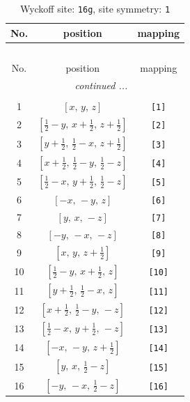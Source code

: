 \documentclass[fleqn,8pt]{jsarticle}
\begin{document}
\begin{longtable}{ccc}
\caption{Wyckoff site: {\tt 16g}, site symmetry: {\tt 1}}
 \\
 \hline \hline
No. & position & mapping \\ \hline \endfirsthead

\multicolumn{2}{l}{\tablename\ \thetable{}} \\
 \hline \hline
No. & position & mapping \\ \hline \endhead

 \hline \hline
\multicolumn{2}{r}{\footnotesize\it continued ...} \\ \endfoot

 \hline \hline
\multicolumn{2}{r}{} \\ \endlastfoot

1 & $\left[ x,\, y,\, z \right]$ & {\tt [1]} \\ \hline
2 & $\left[ \frac{1}{2} - y,\, x + \frac{1}{2},\, z + \frac{1}{2} \right]$ & {\tt [2]} \\ \hline
3 & $\left[ y + \frac{1}{2},\, \frac{1}{2} - x,\, z + \frac{1}{2} \right]$ & {\tt [3]} \\ \hline
4 & $\left[ x + \frac{1}{2},\, \frac{1}{2} - y,\, \frac{1}{2} - z \right]$ & {\tt [4]} \\ \hline
5 & $\left[ \frac{1}{2} - x,\, y + \frac{1}{2},\, \frac{1}{2} - z \right]$ & {\tt [5]} \\ \hline
6 & $\left[ - x,\, - y,\, z \right]$ & {\tt [6]} \\ \hline
7 & $\left[ y,\, x,\, - z \right]$ & {\tt [7]} \\ \hline
8 & $\left[ - y,\, - x,\, - z \right]$ & {\tt [8]} \\ \hline
9 & $\left[ x,\, y,\, z + \frac{1}{2} \right]$ & {\tt [9]} \\ \hline
10 & $\left[ \frac{1}{2} - y,\, x + \frac{1}{2},\, z \right]$ & {\tt [10]} \\ \hline
11 & $\left[ y + \frac{1}{2},\, \frac{1}{2} - x,\, z \right]$ & {\tt [11]} \\ \hline
12 & $\left[ x + \frac{1}{2},\, \frac{1}{2} - y,\, - z \right]$ & {\tt [12]} \\ \hline
13 & $\left[ \frac{1}{2} - x,\, y + \frac{1}{2},\, - z \right]$ & {\tt [13]} \\ \hline
14 & $\left[ - x,\, - y,\, z + \frac{1}{2} \right]$ & {\tt [14]} \\ \hline
15 & $\left[ y,\, x,\, \frac{1}{2} - z \right]$ & {\tt [15]} \\ \hline
16 & $\left[ - y,\, - x,\, \frac{1}{2} - z \right]$ & {\tt [16]} \\
\end{longtable}
\end{document}

